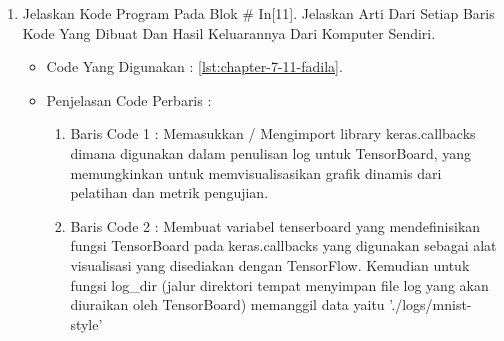 \begin{enumerate}
\begin{itemize}
\begin{enumerate}
\item Baris Code 10	: Untuk output layer menggunakan data dari variabel num\_classes dengan fugsi activationnya softmax.
\item Baris Code 11	: Melakukan konfigurasi dari proses pembelajaran, yang dilakukan melalui metode compile,sebelum melatih suatu model.
\item Baris Code 12	: Mencetak dan menampilkan representasi ringkasan model yang telah dibuat berdasrkan fungsi-fungsi yang diterapkan
\end{enumerate}
\par
\item Hasil : \ref{chapter-7-in-10-fadila}
\par
\par
\begin{figure}[!hbtp]
\centering
\texttt{[image: figures/chapter-7-in-10-fadila.jpg]}
\caption{Code Program Pada In [10] - fadila}
\label{chapter-7-in-10-fadila}
\end{figure}
\par
\par
\end{itemize}
\par
\par
\par
\item Jelaskan Kode Program Pada Blok \# In[11]. Jelaskan Arti Dari Setiap Baris Kode Yang Dibuat Dan Hasil Keluarannya Dari Komputer Sendiri.
\begin{itemize}
\item Code Yang Digunakan : \ref{lst:chapter-7-11-fadila}.

\par
\par
\item Penjelasan Code Perbaris	: 
\begin{enumerate}
\item Baris Code 1	: Memasukkan / Mengimport library keras.callbacks dimana digunakan dalam penulisan log untuk TensorBoard, yang memungkinkan untuk memvisualisasikan grafik dinamis dari pelatihan dan metrik pengujian.
\item Baris Code 2	: Membuat variabel tenserboard yang mendefinisikan fungsi TensorBoard pada keras.callbacks yang digunakan sebagai alat visualisasi yang disediakan dengan TensorFlow. Kemudian untuk fungsi log\_dir (jalur direktori tempat menyimpan file log yang akan diuraikan oleh TensorBoard) memanggil data yaitu './logs/mnist-style'

\end{enumerate}
\end{itemize}
\end{enumerate}
